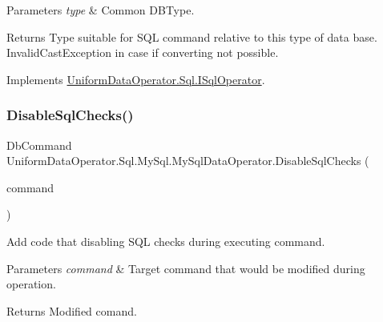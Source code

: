 \begin{DoxyParams}{Parameters}
{\em type} & Common D\+B\+Type.\\
\hline
\end{DoxyParams}
\begin{DoxyReturn}{Returns}
Type suitable for S\+QL command relative to this type of data base. Invalid\+Cast\+Exception in case if converting not possible.
\end{DoxyReturn}


Implements \mbox{\hyperlink{interface_uniform_data_operator_1_1_sql_1_1_i_sql_operator_a51af40df39808d53cdcc81852b836634}{Uniform\+Data\+Operator.\+Sql.\+I\+Sql\+Operator}}.

\mbox{\label{class_uniform_data_operator_1_1_sql_1_1_my_sql_1_1_my_sql_data_operator_affbacb4fb1773fc14cdbb9cbcd315c5f}} 
\subsubsection{\texorpdfstring{Disable\+Sql\+Checks()}{DisableSqlChecks()}\hspace{0.1cm}{\footnotesize\ttfamily [1/2]}}
{\footnotesize\ttfamily Db\+Command Uniform\+Data\+Operator.\+Sql.\+My\+Sql.\+My\+Sql\+Data\+Operator.\+Disable\+Sql\+Checks (\begin{DoxyParamCaption}\item[{Db\+Command}]{command }\end{DoxyParamCaption})}



Add code that disabling S\+QL checks during executing command. 


\begin{DoxyParams}{Parameters}
{\em command} & Target command that would be modified during operation.\\
\hline
\end{DoxyParams}
\begin{DoxyReturn}{Returns}
Modified comand.
\end{DoxyReturn}


